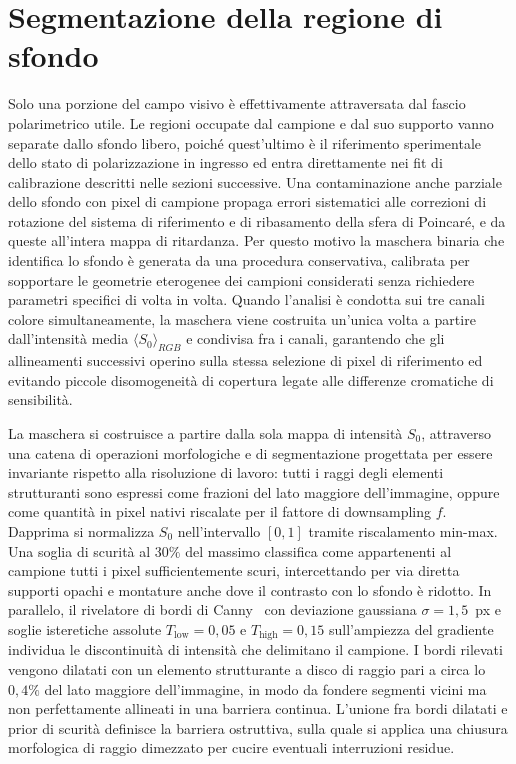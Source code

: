 \section{Segmentazione della regione di sfondo}
\label{sec:mascheramento}

Solo una porzione del campo visivo è effettivamente attraversata dal fascio polarimetrico utile. Le regioni occupate dal campione e dal suo supporto vanno separate dallo sfondo libero, poiché quest'ultimo è il riferimento sperimentale dello stato di polarizzazione in ingresso ed entra direttamente nei fit di calibrazione descritti nelle sezioni successive. Una contaminazione anche parziale dello sfondo con pixel di campione propaga errori sistematici alle correzioni di rotazione del sistema di riferimento e di ribasamento della sfera di Poincaré, e da queste all'intera mappa di ritardanza. Per questo motivo la maschera binaria che identifica lo sfondo è generata da una procedura conservativa, calibrata per sopportare le geometrie eterogenee dei campioni considerati senza richiedere parametri specifici di volta in volta. Quando l'analisi è condotta sui tre canali colore simultaneamente, la maschera viene costruita un'unica volta a partire dall'intensità media $\langle S_0 \rangle_{RGB}$ e condivisa fra i canali, garantendo che gli allineamenti successivi operino sulla stessa selezione di pixel di riferimento ed evitando piccole disomogeneità di copertura legate alle differenze cromatiche di sensibilità.

La maschera si costruisce a partire dalla sola mappa di intensità $S_0$, attraverso una catena di operazioni morfologiche e di segmentazione progettata per essere invariante rispetto alla risoluzione di lavoro: tutti i raggi degli elementi strutturanti sono espressi come frazioni del lato maggiore dell'immagine, oppure come quantità in pixel nativi riscalate per il fattore di downsampling $f$. Dapprima si normalizza $S_0$ nell'intervallo $[0, 1]$ tramite riscalamento min-max. Una soglia di scurità al $30\%$ del massimo classifica come appartenenti al campione tutti i pixel sufficientemente scuri, intercettando per via diretta supporti opachi e montature anche dove il contrasto con lo sfondo è ridotto. In parallelo, il rivelatore di bordi di Canny~\cite{Canny1986edge} con deviazione gaussiana $\sigma = 1{,}5$~px e soglie isteretiche assolute $T_{\mathrm{low}} = 0{,}05$ e $T_{\mathrm{high}} = 0{,}15$ sull'ampiezza del gradiente individua le discontinuità di intensità che delimitano il campione. I bordi rilevati vengono dilatati con un elemento strutturante a disco di raggio pari a circa lo $0{,}4\%$ del lato maggiore dell'immagine, in modo da fondere segmenti vicini ma non perfettamente allineati in una barriera continua. L'unione fra bordi dilatati e prior di scurità definisce la barriera ostruttiva, sulla quale si applica una chiusura morfologica di raggio dimezzato per cucire eventuali interruzioni residue.

